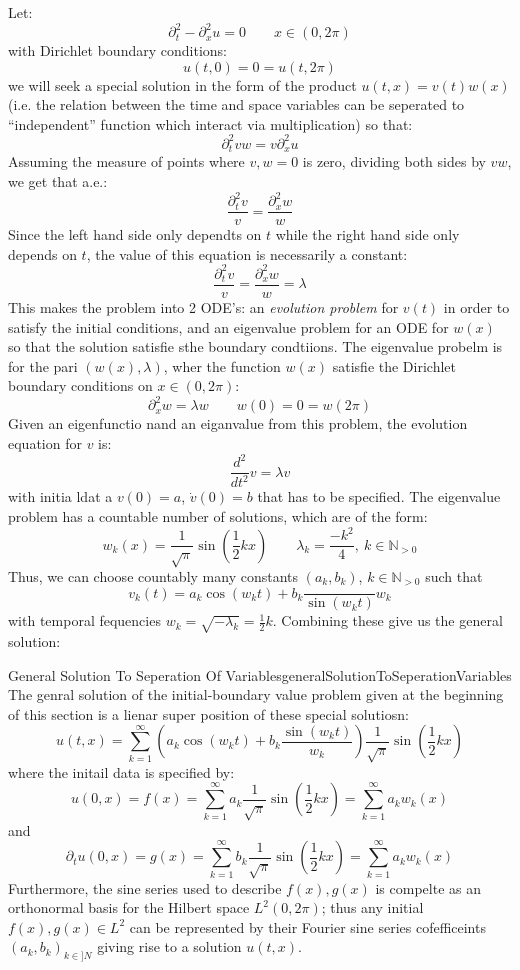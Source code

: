 \documentclass{book}
\newcommand{\N}{{\mathbb{N}}}
\begin{document}
Let:
\[
	 \partial_t^2 -  \partial_x^2 u  =0 \qquad x \in (0, 2\pi)
\]
with Dirichlet boundary conditions:
\[
	u(t,0) = 0 = u(t, 2\pi)
\]
we will seek a special solution in the form of the product $u(t,x) = v(t)w(x)$ (i.e. the relation between the time and
space variables can be seperated to ``independent'' function which interact via multiplication) so that:
\[
	 \partial_t^2 v w = v  \partial_x^2u
\]
Assuming the measure of points where $v,w = 0$ is zero, dividing both sides by $vw$, we get that a.e.:
\[
	 \frac{\partial_t^2 v}{v} =  \frac{  \partial_x^2 w }{w}
\]
Since the left hand side only dependts on $t$ while the right hand side only depends on $t$, the value of this equation
is necessarily a constant:
\[
	 \frac{\partial_t^2 v}{v} =  \frac{  \partial_x^2 w }{w} = \lambda
\]
This makes the problem into 2 ODE's: an \emph{evolution problem} for $v(t)$ in order to satisfy the initial conditions,
and an eigenvalue problem for an ODE for $w(x)$ so that the solution satisfie sthe boundary condtiions. The eigenvalue
probelm is for the pari $(w(x), \lambda)$, wher the function $w(x)$ satisfie the Dirichlet boundary conditions on $x \in
(0, 2\pi)$:
\[
	 \partial_x^2 w = \lambda w \qquad w(0) = 0 = w(2\pi)
\]
Given an eigenfunctio nand an eiganvalue from this problem, the evolution equation for $v$ is:
\[
	\frac{d^2}{dt^2}v = \lambda v
\]
with initia ldat a $v(0) = a$, $\dot v(0) = b$ that has to be specified. The eigenvalue problem has a countable number
of solutions, which are of the form:
\[
	w_k(x) =  \frac{1}{\sqrt{\pi}} \sin\left( \frac{1}{2}kx\right) \qquad \lambda_k = \frac{-k^2}{4},\ k \in \N_{>0}
\]
Thus, we can choose countably many constants $(a_k, b_k)$, $k \in \N_{>0}$ such that
\[
	v_k(t) = a_k\cos(w_k t) + b_k \frac{}{\sin(w_kt)}{w_k}
\]
with temporal fequencies $w_k = \sqrt{-\lambda_k} = \frac{1}{2}k$. Combining these give us the general solution:

\begin{thm}{General Solution To Seperation Of Variables}{generalSolutionToSeperationVariables}
	The genral solution of the initial-boundary value problem given at the beginning of this section is a lienar
	super position of these special solutiosn:
	\[
		u(t,x) = \sum_{k=1}^\infty \left( a_k\cos(w_k t) + b_k \frac{\sin(w_k
		t)}{w_k}\right)\frac{1}{\sqrt{\pi}}\sin\left( \frac{1}{2} kx\right)
	\]
	where the initail data is specified by:
	\[
		u(0,x) = f(x) = \sum_{k=1}^\infty a_k \frac{1}{\sqrt{\pi}} \sin\left( \frac{1}{2} kx\right) = \sum_{k=1}^\infty
		a_kw_k(x)
	\]
	and
	\[
		 \partial_t u(0,x) = g(x) = \sum_{k=1}^\infty b_k \frac{1}{\sqrt{\pi}} \sin\left( \frac{1}{2} kx\right) = \sum_{k=1}^\infty
		a_kw_k(x)
	\]
	Furthermore, the sine series used to describe $f(x), g(x)$ is compelte as an orthonormal basis for the Hilbert
	space $L^2(0, 2\pi)$; thus any initial $f(x), g(x) \in L^2$ can be represented by their Fourier sine series
	cofefficeints $(a_k, b_k)_{k \in ]N}$ giving rise to a solution $u(t,x)$.
\end{thm}
\end{document}
